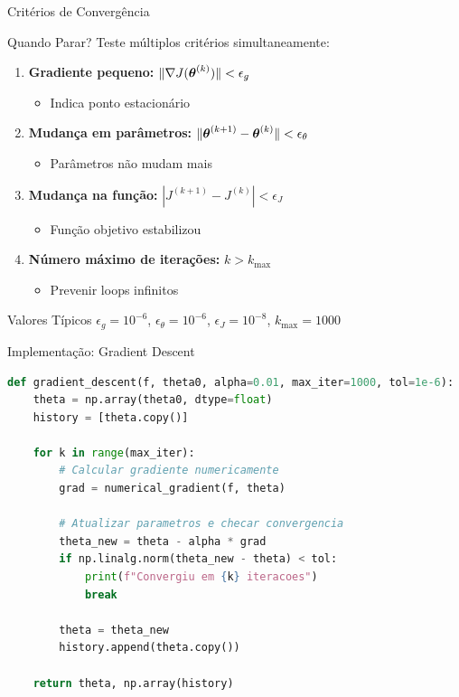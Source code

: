 \begin{frame}{Critérios de Convergência}
\begin{block}{Quando Parar?}
Teste múltiplos critérios simultaneamente:
\end{block}

\begin{enumerate}
    \item \textbf{Gradiente pequeno:} $\|\nabla J(\boldsymbol{\theta}^{(k)})\| < \epsilon_g$
    \begin{itemize}
        \item Indica ponto estacionário
    \end{itemize}

    \item \textbf{Mudança em parâmetros:} $\|\boldsymbol{\theta}^{(k+1)} - \boldsymbol{\theta}^{(k)}\| < \epsilon_\theta$
    \begin{itemize}
        \item Parâmetros não mudam mais
    \end{itemize}

    \item \textbf{Mudança na função:} $|J^{(k+1)} - J^{(k)}| < \epsilon_J$
    \begin{itemize}
        \item Função objetivo estabilizou
    \end{itemize}

    \item \textbf{Número máximo de iterações:} $k > k_{\max}$
    \begin{itemize}
        \item Prevenir loops infinitos
    \end{itemize}
\end{enumerate}

\begin{exampleblock}{Valores Típicos}
$\epsilon_g = 10^{-6}$, $\epsilon_\theta = 10^{-6}$, $\epsilon_J = 10^{-8}$, $k_{\max} = 1000$
\end{exampleblock}
\end{frame}

\begin{frame}[fragile]{Implementação: Gradient Descent}
\begin{lstlisting}[language=Python, caption=Descida do gradiente principal, basicstyle=\ttfamily\scriptsize]
def gradient_descent(f, theta0, alpha=0.01, max_iter=1000, tol=1e-6):
    theta = np.array(theta0, dtype=float)
    history = [theta.copy()]

    for k in range(max_iter):
        # Calcular gradiente numericamente
        grad = numerical_gradient(f, theta)

        # Atualizar parametros e checar convergencia
        theta_new = theta - alpha * grad
        if np.linalg.norm(theta_new - theta) < tol:
            print(f"Convergiu em {k} iteracoes")
            break

        theta = theta_new
        history.append(theta.copy())

    return theta, np.array(history)
\end{lstlisting}
\end{frame}

